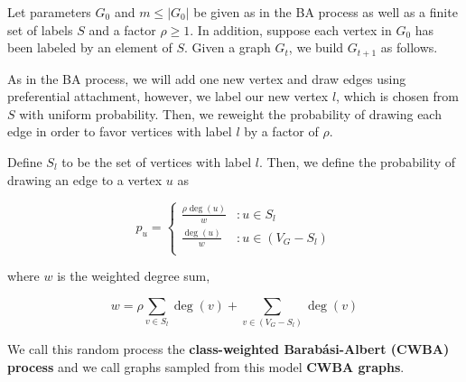 \begin{definition}
  Let parameters $G_0$ and $m \leq |G_0|$ be given as in the BA process as well
  as a finite set of labels $S$ and a factor $\rho \ge 1$. In addition, suppose
  each vertex in $G_0$ has been labeled by an element of $S$. Given a graph
  $G_t$, we build $G_{t+1}$ as follows.

  As in the BA process, we will add one new vertex and draw edges using
  preferential attachment, however, we label our new vertex $l$, which is chosen
  from $S$ with uniform probability. Then, we reweight the probability of
  drawing each edge in order to favor vertices with label $l$ by a factor of
  $\rho$.

  Define $S_l$ to be the set of vertices with label $l$. Then, we define the
  probability of drawing an edge to a vertex $u$ as

  \[
    p_u = \begin{cases}
      \frac{\rho\deg(u)}{w} &: u \in S_l\\
      
      \frac{\deg(u)}{w} &: u \in (V_G - S_l)\\
    \end{cases}
  \]

  where $w$ is the weighted degree sum,

  \[
    w = \rho \sum_{v \in S_l}\deg(v) + \sum_{v \in (V_G - S_l)}\deg(v)
  \]

  We call this random process the \textbf{class-weighted Barab\'asi-Albert
    (CWBA) process} and we call graphs sampled from this model \textbf{CWBA
    graphs}.

\end{definition}

